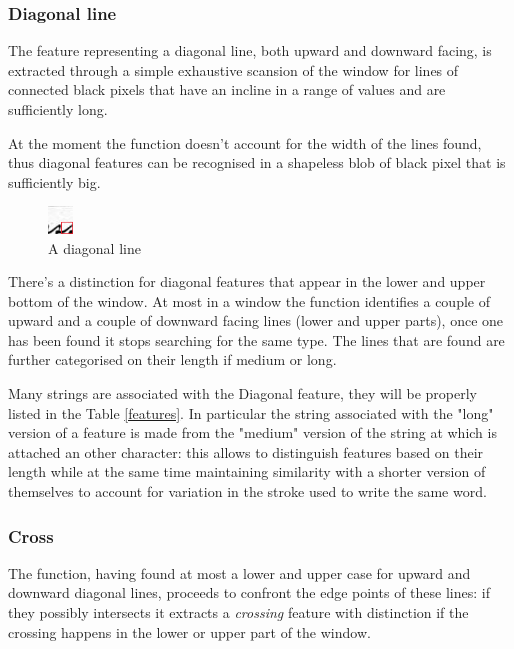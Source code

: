 \subsubsection{Diagonal line}

The feature representing a diagonal line, both upward and downward facing, is extracted through a simple exhaustive scansion of the window for lines of connected black pixels that have an incline in a range of values and are sufficiently long.

At the moment the function doesn't account for the width of the lines found, thus diagonal features can be recognised in a shapeless blob of black pixel that is sufficiently big. 
\begin{figure}
  \vspace{-20pt}
  \begin{center}
    \includegraphics[width=0.06\textwidth]{images/diagonal.jpg}
  \end{center}
  \vspace{-20pt}
  \caption{A diagonal line}
  \vspace{-10pt}
\end{figure}
   
There's a distinction for diagonal features that appear in the lower and upper bottom of the window.
At most in a window the function identifies a couple of upward and a couple of downward facing lines (lower and upper parts), once one has been found it stops searching for the same type.
The lines that are found are further categorised on their length if medium or long.

Many strings are associated with the Diagonal feature, they will be properly listed in the Table \ref{features}.
In particular the string associated with the "long" version of a feature is made from the "medium" version of the string at which is attached an other character: this allows to distinguish features based on their length while at the same time maintaining similarity with a shorter version of themselves to account for variation in the stroke used to write the same word.  
 
\subsubsection{Cross}
The function, having found at most a lower and upper case for upward and downward diagonal lines, proceeds to confront the edge points of these lines: if they possibly intersects it extracts a \emph{crossing} feature with distinction if the crossing happens in the lower or upper part of the window. 

